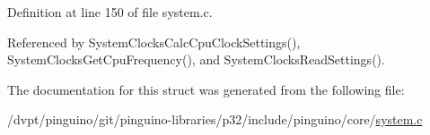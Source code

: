 Definition at line 150 of file system.\-c.



Referenced by System\-Clocks\-Calc\-Cpu\-Clock\-Settings(), System\-Clocks\-Get\-Cpu\-Frequency(), and System\-Clocks\-Read\-Settings().



The documentation for this struct was generated from the following file\-:\begin{DoxyCompactItemize}
\item 
/dvpt/pinguino/git/pinguino-\/libraries/p32/include/pinguino/core/\hyperlink{p32_2include_2pinguino_2core_2system_8c}{system.\-c}\end{DoxyCompactItemize}
